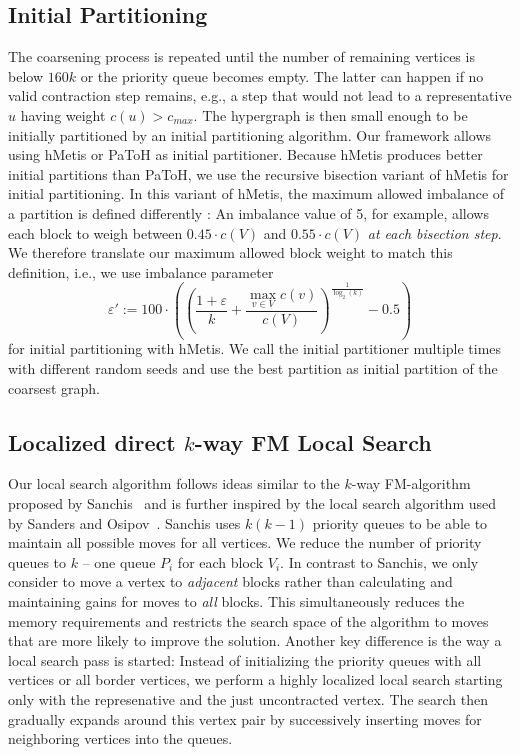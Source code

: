 \documentclass[runningheads,a4paper]{llncs}
\begin{document}
\subsection{Initial Partitioning} \label{InitialPartitioning}
The coarsening process is repeated until the number of remaining vertices is below $160k$ or the priority queue becomes empty. The latter can happen if no valid contraction step remains, e.g., a step that would not lead to a representative $u$ having weight $c(u) > c_{max}$. The hypergraph is then small enough to
be initially partitioned by an initial partitioning algorithm. Our framework allows using hMetis or PaToH as initial partitioner.
Because hMetis produces better initial partitions than PaToH, we use the recursive bisection variant of hMetis for initial partitioning.
In this variant of hMetis, the maximum allowed imbalance of a partition is defined differently \cite{hMetisRB}: An imbalance value of 5, for example,
allows each block to weigh between $0.45 \cdot c(V)$ and $0.55 \cdot c(V)$ \emph{at each bisection step}. We therefore translate our maximum allowed block 
weight to match this definition, i.e., we use imbalance parameter 
\begin{equation} \label{eq:RBimbalance}
\varepsilon' := 100 \cdot \left(\left( \frac{1+\varepsilon}{k} + \frac{\max_{v \in V} c(v)}{c(V)}\right)^{\frac{1}{\log_2(k)}} - 0.5 \right)
\end{equation}
for initial partitioning with hMetis. We call the initial partitioner multiple times with different random seeds and use  the best partition as initial partition of the coarsest graph.

\subsection{Localized direct $k$-way FM Local Search} \label{localizedFM}
Our local search algorithm follows ideas similar to the $k$-way FM-algorithm proposed by Sanchis~\cite{HypergraphKFM} and is further inspired by the local search algorithm used by Sanders and Osipov~\cite{nGP}. Sanchis uses $k (k-1)$ priority queues
to be able to maintain all possible moves for all vertices. We reduce the number of priority queues to $k$ -- one queue $P_i$
for each block $V_i$. In contrast to Sanchis, we only consider to move a vertex to \emph{adjacent} blocks rather than calculating
and maintaining gains for moves to \emph{all} blocks. This simultaneously reduces the memory requirements and restricts the search
space of the algorithm to moves that are more likely to improve the solution. Another key difference is the way a local search pass
is started: Instead of initializing the priority queues with all vertices or all border vertices, we perform a highly localized 
local search starting only with the represenative and the just uncontracted vertex. The search then gradually expands around
this vertex pair by successively inserting moves for neighboring vertices into the queues.
\end{document}
